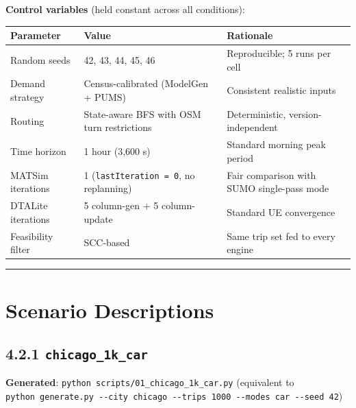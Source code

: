 \textbf{Control variables} (held constant across all conditions):

\begin{longtable}[]{@{}lll@{}}
\toprule\noalign{}
Parameter & Value & Rationale \\
\midrule\noalign{}
\endhead
\bottomrule\noalign{}
\endlastfoot
Random seeds & 42, 43, 44, 45, 46 & Reproducible; 5 runs per cell \\
Demand strategy & Census-calibrated (ModelGen + PUMS) & Consistent
realistic inputs \\
Routing & State-aware BFS with OSM turn restrictions & Deterministic,
version-independent \\
Time horizon & 1 hour (3,600 s) & Standard morning peak period \\
MATSim iterations & 1 (\texttt{lastIteration\ =\ 0}, no replanning) &
Fair comparison with SUMO single-pass mode \\
DTALite iterations & 5 column-gen + 5 column-update & Standard UE
convergence \\
Feasibility filter & SCC-based & Same trip set fed to every engine \\
\end{longtable}

\begin{center}\rule{0.5\linewidth}{0.5pt}\end{center}

\section{Scenario Descriptions}\label{42-scenario-descriptions}

\subsection{\texorpdfstring{4.2.1
\texttt{chicago\_1k\_car}}{4.2.1 chicago\_1k\_car}}\label{421-chicago_1k_car}

\textbf{Generated}: \texttt{python\ scripts/01\_chicago\_1k\_car.py}
(equivalent to
\texttt{python\ generate.py\ -\/-city\ chicago\ -\/-trips\ 1000\ -\/-modes\ car\ -\/-seed\ 42})

